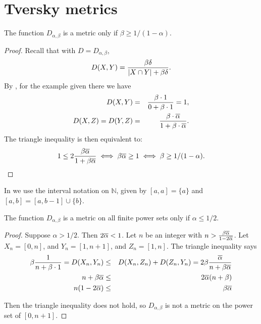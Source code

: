 	\section{Tversky metrics}
		\begin{theorem}\label{well}
			The function $D_{\alpha,\beta}$ is a metric only if $\beta\ge 1/(1-\alpha)$.
		\end{theorem}
		\begin{proof}
			Recall that with $D=D_{\alpha,\beta}$,
			\[
				D(X,Y)=\frac{\beta\delta}{\lvert X\cap Y\rvert+\beta\delta}.
			\]
			By , for the example given there we have
			\begin{eqnarray*}
				D(X,Y) &=& \frac{\beta\cdot 1}{0+\beta\cdot 1} = 1,
			\\
				D(X,Z) = D(Y,Z) &=& \frac{\beta\cdot\overline{\alpha}}{1+\beta\cdot \overline{\alpha}}.
			\end{eqnarray*}
			The triangle inequality is then equivalent to:
			\[
				1\le 2\frac{\beta\overline{\alpha}}{1+\beta\overline{\alpha}}\iff \beta\overline{\alpha}\ge 1
		\iff\beta\ge 1/(1-\alpha).\qedhere
			\]
		\end{proof}
		In  we use the interval notation on $\mathbb N$, given by $[a,a]=\{a\}$ and $[a,b]=[a,b-1]\cup\{b\}$.
		\begin{theorem}\label{pyEx}
			The function $D_{\alpha,\beta}$ is a metric on all finite power sets
			only if $\alpha\le 1/2$.
		\end{theorem}
		\begin{proof}
			Suppose $\alpha>1/2$.
			Then $2\overline{\alpha}<1$.
			Let $n$ be an integer with $n>\frac{\beta\overline{\alpha}}{1-2\overline{\alpha}}$.		Let $X_n=[0,n]$, and $Y_n=[1,n+1]$, and $Z_n=[1,n]$.
			The triangle inequality says
			\begin{eqnarray*}
				\beta\frac{1}{n+\beta\cdot 1} = D(X_n,Y_n)&\le& D(X_n,Z_n)+D(Z_n,Y_n)=2\beta \frac{\overline{\alpha}}{n+\beta\overline{\alpha}}
			\\
				n+\beta\overline{\alpha} &\le& 2 \overline{\alpha}(n+\beta)
			\\
				n(1-2\overline{\alpha})&\le& \beta\overline{\alpha}
			\end{eqnarray*}

			Then the triangle inequality does not hold, so $D_{\alpha,\beta}$ is not a metric on
			the power set of $[0,n+1]$.
		\end{proof}



